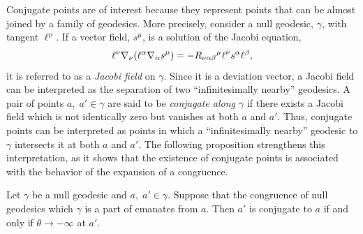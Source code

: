 \documentclass[
12pt,		%
openright,	%
twoside,  %
a4paper,			%
chapter=TITLE,		%
english,			%
french,				%
spanish,			%
brazil				%
]{USPSC-classe/USPSC}
\begin{document}
Conjugate points are of interest because they represent points that can be almost joined by a family of geodesics. More precisely, consider a null geodesic, $\gamma$, with tangent $\ell^{\mu}$. If a vector field, $s^{\mu}$, is a solution of the Jacobi equation, 
\begin{equation}
   \ell^{\nu}\nabla_{\nu}(\ell^{\alpha}\nabla_{\alpha}s^{\mu})=-R_{\nu\alpha\beta}\mathstrut^{\mu}\ell^{\nu}s^{\alpha}\ell^{\beta},
\end{equation}
it is referred to as a \textit{Jacobi field} on $\gamma$. Since it is a deviation vector, a Jacobi field can be interpreted as the separation of two “infinitesimally nearby” geodesics. A pair of points $a,\;a'\in \gamma$ are said to be \textit{conjugate along $\gamma$} if there exists a Jacobi field which is not identically zero but vanishes at both $a$ and $a'$. Thus, conjugate points can be interpreted as points in which a “infinitesimally nearby” geodesic to $\gamma$ intersects it at both $a$ and $a'$. The following proposition strengthens this interpretation, as it shows that the existence of conjugate points is associated with the behavior of the expansion of a congruence.
\begin{proposition}\label{p1}
    Let $\gamma$ be a null geodesic and $a,\;a'\in\gamma$. Suppose that the congruence of null geodesics which $\gamma$ is a part of emanates from $a$. Then $a'$ is conjugate to $a$ if and only if $\theta\to-\infty$ at $a'$.
\end{proposition}
\end{document}
